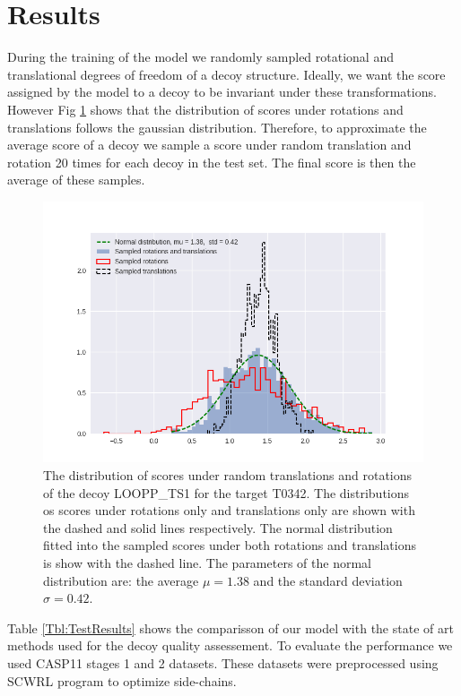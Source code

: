 \documentclass[a4paper,10pt]{article}
\begin{document}
\section{Results}
During the training of the model we randomly sampled rotational and translational degrees of freedom of a decoy structure. Ideally, we 
want the score assigned by the model to a decoy to be invariant under these transformations. However Fig \ref{Fig:ScoreDistribution} 
shows that the distribution
of scores under rotations and translations follows the gaussian distribution. Therefore, to approximate the average score of a decoy we 
sample a score under random translation and rotation 20 times for each decoy in the test set. The final score is then the average of these 
samples.

\begin{figure}[H]
    \centering
    \includegraphics[width=\linewidth]{Fig/sampling_dist.png}
    \caption{The distribution of scores under random translations and rotations of the decoy LOOPP\_TS1 for the target T0342. The distributions 
    os scores under rotations only and translations only are shown with the dashed and solid lines respectively.
    The normal distribution fitted into the sampled scores under both rotations and translations is show with the dashed line. 
    The parameters of the normal distribution are: the average $\mu = 1.38$ and the standard deviation $\sigma = 0.42$.}
    \label{Fig:ScoreDistribution}
\end{figure}


Table \ref{Tbl:TestResults} shows the comparisson of our model with the state of art methods used for the decoy quality assessement. 
To evaluate the performance we used CASP11 stages 1 and 2 datasets. 
These datasets were preprocessed using SCWRL program to optimize side-chains. 
\end{document}
